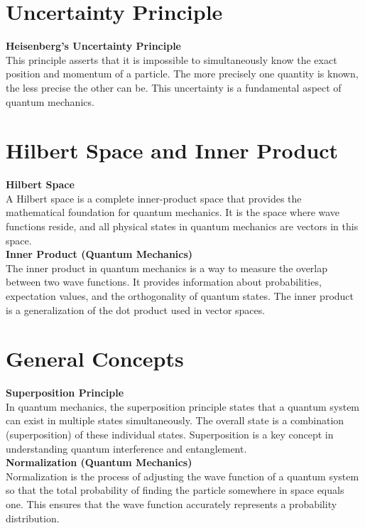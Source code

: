 \documentclass[a4paper,12pt]{article}
\begin{document}
\begin{footnotesize}
\begin{multicols}{3}
\section*{Uncertainty Principle}

\textbf{Heisenberg's Uncertainty Principle} \\
This principle asserts that it is impossible to simultaneously know the exact position and momentum of a particle. The more precisely one quantity is known, the less precise the other can be. This uncertainty is a fundamental aspect of quantum mechanics. \\


\section*{Hilbert Space and Inner Product}

\textbf{Hilbert Space} \\
A Hilbert space is a complete inner-product space that provides the mathematical foundation for quantum mechanics. It is the space where wave functions reside, and all physical states in quantum mechanics are vectors in this space. \\

\textbf{Inner Product (Quantum Mechanics)} \\
The inner product in quantum mechanics is a way to measure the overlap between two wave functions. It provides information about probabilities, expectation values, and the orthogonality of quantum states. The inner product is a generalization of the dot product used in vector spaces. \\

\section*{General Concepts}

\textbf{Superposition Principle} \\
In quantum mechanics, the superposition principle states that a quantum system can exist in multiple states simultaneously. The overall state is a combination (superposition) of these individual states. Superposition is a key concept in understanding quantum interference and entanglement. \\

\textbf{Normalization (Quantum Mechanics)} \\
Normalization is the process of adjusting the wave function of a quantum system so that the total probability of finding the particle somewhere in space equals one. This ensures that the wave function accurately represents a probability distribution. \\


\end{multicols}
\end{footnotesize}
\end{document}

